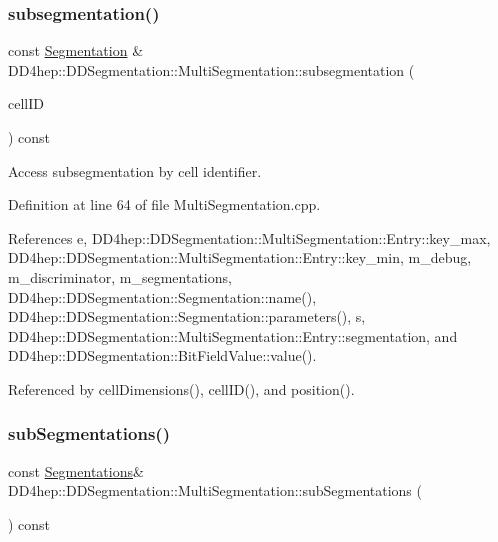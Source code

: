 \subsubsection{\texorpdfstring{subsegmentation()}{subsegmentation()}}
{\footnotesize\ttfamily const \hyperlink{class_d_d4hep_1_1_d_d_segmentation_1_1_segmentation}{Segmentation} \& D\+D4hep\+::\+D\+D\+Segmentation\+::\+Multi\+Segmentation\+::subsegmentation (\begin{DoxyParamCaption}\item[{const \hyperlink{namespace_d_d4hep_1_1_d_d_segmentation_ac7af071d85cb48820914434a07e21ba1}{Cell\+ID} \&}]{cell\+ID }\end{DoxyParamCaption}) const}



Access subsegmentation by cell identifier. 



Definition at line 64 of file Multi\+Segmentation.\+cpp.



References e, D\+D4hep\+::\+D\+D\+Segmentation\+::\+Multi\+Segmentation\+::\+Entry\+::key\+\_\+max, D\+D4hep\+::\+D\+D\+Segmentation\+::\+Multi\+Segmentation\+::\+Entry\+::key\+\_\+min, m\+\_\+debug, m\+\_\+discriminator, m\+\_\+segmentations, D\+D4hep\+::\+D\+D\+Segmentation\+::\+Segmentation\+::name(), D\+D4hep\+::\+D\+D\+Segmentation\+::\+Segmentation\+::parameters(), s, D\+D4hep\+::\+D\+D\+Segmentation\+::\+Multi\+Segmentation\+::\+Entry\+::segmentation, and D\+D4hep\+::\+D\+D\+Segmentation\+::\+Bit\+Field\+Value\+::value().



Referenced by cell\+Dimensions(), cell\+I\+D(), and position().

\hypertarget{class_d_d4hep_1_1_d_d_segmentation_1_1_multi_segmentation_ace27c57dfd4a10a4ef80f721f7d24f01}{}\label{class_d_d4hep_1_1_d_d_segmentation_1_1_multi_segmentation_ace27c57dfd4a10a4ef80f721f7d24f01} 
\subsubsection{\texorpdfstring{sub\+Segmentations()}{subSegmentations()}}
{\footnotesize\ttfamily const \hyperlink{class_d_d4hep_1_1_d_d_segmentation_1_1_multi_segmentation_a083ba7cc081c5c3c47cafac5980100f8}{Segmentations}\& D\+D4hep\+::\+D\+D\+Segmentation\+::\+Multi\+Segmentation\+::sub\+Segmentations (\begin{DoxyParamCaption}{ }\end{DoxyParamCaption}) const\hspace{0.3cm}{\ttfamily [inline]}}



